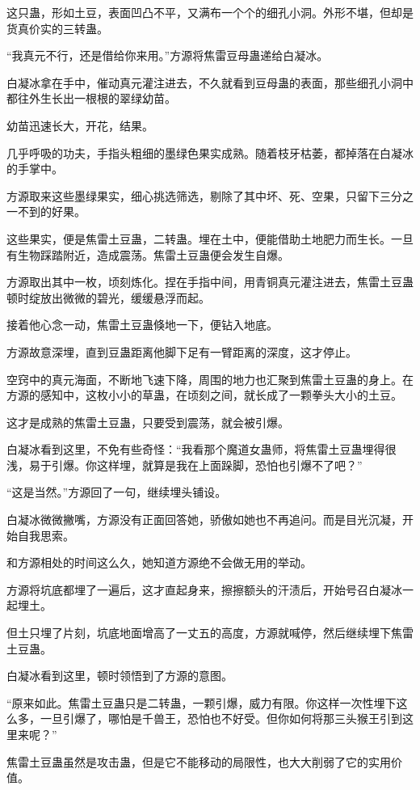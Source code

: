 \begin{this_body}
这只蛊，形如土豆，表面凹凸不平，又满布一个个的细孔小洞。外形不堪，但却是货真价实的三转蛊。

“我真元不行，还是借给你来用。”方源将焦雷豆母蛊递给白凝冰。

白凝冰拿在手中，催动真元灌注进去，不久就看到豆母蛊的表面，那些细孔小洞中都往外生长出一根根的翠绿幼苗。

幼苗迅速长大，开花，结果。

几乎呼吸的功夫，手指头粗细的墨绿色果实成熟。随着枝牙枯萎，都掉落在白凝冰的手掌中。

方源取来这些墨绿果实，细心挑选筛选，剔除了其中坏、死、空果，只留下三分之一不到的好果。

这些果实，便是焦雷土豆蛊，二转蛊。埋在土中，便能借助土地肥力而生长。一旦有生物踩踏附近，造成震荡。焦雷土豆蛊便会发生自爆。

方源取出其中一枚，顷刻炼化。捏在手指中间，用青铜真元灌注进去，焦雷土豆蛊顿时绽放出微微的碧光，缓缓悬浮而起。

接着他心念一动，焦雷土豆蛊倏地一下，便钻入地底。

方源故意深埋，直到豆蛊距离他脚下足有一臂距离的深度，这才停止。

空窍中的真元海面，不断地飞速下降，周围的地力也汇聚到焦雷土豆蛊的身上。在方源的感知中，这枚小小的草蛊，在顷刻之间，就长成了一颗拳头大小的土豆。

这才是成熟的焦雷土豆蛊，只要受到震荡，就会被引爆。

白凝冰看到这里，不免有些奇怪：“我看那个魔道女蛊师，将焦雷土豆蛊埋得很浅，易于引爆。你这样埋，就算是我在上面跺脚，恐怕也引爆不了吧？”

“这是当然。”方源回了一句，继续埋头铺设。

白凝冰微微撇嘴，方源没有正面回答她，骄傲如她也不再追问。而是目光沉凝，开始自我思索。

和方源相处的时间这么久，她知道方源绝不会做无用的举动。

方源将坑底都埋了一遍后，这才直起身来，擦擦额头的汗渍后，开始号召白凝冰一起埋土。

但土只埋了片刻，坑底地面增高了一丈五的高度，方源就喊停，然后继续埋下焦雷土豆蛊。

白凝冰看到这里，顿时领悟到了方源的意图。

“原来如此。焦雷土豆蛊只是二转蛊，一颗引爆，威力有限。你这样一次性埋下这么多，一旦引爆了，哪怕是千兽王，恐怕也不好受。但你如何将那三头猴王引到这里来呢？”

焦雷土豆蛊虽然是攻击蛊，但是它不能移动的局限性，也大大削弱了它的实用价值。


\end{this_body}
